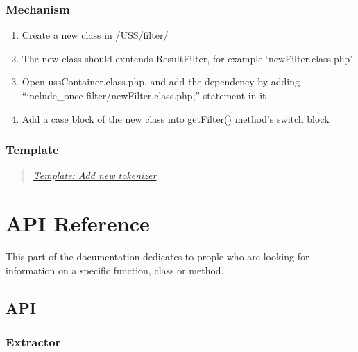 \documentclass[letterpaper,10pt,english]{sphinxmanual}
\begin{document}
\subsection{Mechanism}
\label{docs/hooks/new_filter:mechanism}\begin{enumerate}
\item {} 
Create a new class in /USS/filter/

\item {} 
The new class should exntends ResultFilter, for example `newFilter.class.php'

\item {} 
Open ussContainer.class.php, and add the dependency by adding ``include\_once filter/newFilter.class.php;'' statement in it

\item {} 
Add a case block of the new class into getFilter() method's switch block

\end{enumerate}


\subsection{Template}
\label{docs/hooks/new_filter:template}\begin{quote}

{\hyperref[docs/hooks/t_tokenizer:hook-template-uss]{\emph{Template: Add new tokenizer}}}
\end{quote}


\chapter{API Reference}
\label{index:api-reference}
This part of the documentation dedicates to prople who are looking for information on a specific function, class or method.


\section{API}
\label{docs/api:api}\label{docs/api::doc}\label{docs/api:id1}

\subsection{Extractor}
\label{docs/api:extractor}
\end{document}
